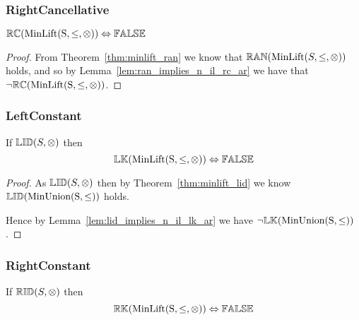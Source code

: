 \documentclass[../Summary.tex]{subfiles}
\begin{document}
\subsubsection{RightCancellative}

\begin{theorem} \label{thm:minlift_rc}
${\mathbb{RC}}(\mathrm{MinLift(S,\leq,\otimes)}) \Leftrightarrow {\mathbb{FALSE}}$
\end{theorem}

\begin{proof}

\vspace{0.5em}
From Theorem~\ref{thm:minlift_ran} we know that ${\mathbb{RAN}}(\mathrm{MinLift}(S,\leq,\otimes))$ holds, and so by Lemma~\ref{lem:ran_implies_n_il_rc_ar} we have that $\neg {\mathbb{RC}}(\mathrm{MinLift(S,\leq,\otimes)})$.
\end{proof}




\subsubsection{LeftConstant}

\begin{theorem} \label{thm:minlift_lk}
If ${\mathbb{LID}}(S,\otimes)$ then
\begin{equation*}
{\mathbb{LK}}(\mathrm{MinLift(S,\leq,\otimes)}) \Leftrightarrow {\mathbb{FALSE}}
\end{equation*}
\end{theorem}

\begin{proof}

\vspace{0.5em}
As ${\mathbb{LID}}(S, \otimes)$ then by Theorem~\ref{thm:minlift_lid} we know ${\mathbb{LID}}(\mathrm{MinUnion(S,\leq)})$ holds.

\vspace{0.5em}
Hence by Lemma~\ref{lem:lid_implies_n_il_lk_ar} we have $\neg {\mathbb{LK}}(\mathrm{MinUnion(S,\leq)})$.
\end{proof}




\subsubsection{RightConstant}

\begin{theorem} \label{thm:minlift_rk}
If ${\mathbb{RID}}(S,\otimes)$ then
\begin{equation*}
{\mathbb{RK}}(\mathrm{MinLift(S,\leq,\otimes)}) \Leftrightarrow {\mathbb{FALSE}}
\end{equation*}
\end{theorem}
\end{document}
